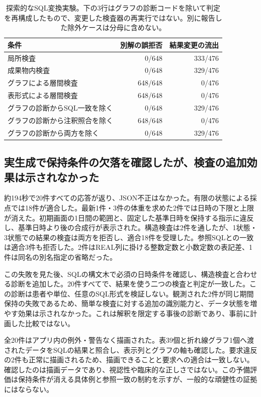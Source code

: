 \documentclass[manuscript,review,anonymous]{acmart}
\begin{document}
\begin{table}[t]
  \caption{探索的なSQL変換実験。下の3行はグラフの診断コードを除いて判定を再構成したもので、変更した検査器の再実行ではない。別に報告した除外ケースは分母に含めない。}
  \label{tab:stress-results}
  \centering
  \small
  \begin{tabular}{lrr}
    \toprule
    条件 & 別解の誤拒否 & 結果変更の流出 \\
    \midrule
    局所検査 & 0/648 & 333/476 \\
    成果物内検査 & 0/648 & 329/476 \\
    グラフによる層間検査 & 648/648 & 0/476 \\
    表形式による層間検査 & 648/648 & 0/476 \\
    グラフの診断からSQL一致を除く & 0/648 & 329/476 \\
    グラフの診断から注釈照合を除く & 648/648 & 0/476 \\
    グラフの診断から両方を除く & 0/648 & 329/476 \\
    \bottomrule
  \end{tabular}
\end{table}

\subsection{実生成で保持条件の欠落を確認したが、検査の追加効果は示されなかった}

約194秒で20件すべての応答が返り、JSON不正はなかった。有限の状態による採点では18件が適合した。最新1件・3件の体重を求めた2件では日時の下限と上限が消えた。初期画面の1日間の範囲と、固定した基準日時を保持する指示に違反し、基準日時より後の合成行が表示された。構造検査は2件を通したが、1状態・3状態での結果の検査は両方を拒否し、適合18件を受理した。参照SQLとの一致は適合3件も拒否した。2件はREAL列に掛ける整数定数と小数定数の表記差、1件は同名の別名指定の省略だった。

この失敗を見た後、SQLの構文木で必須の日時条件を確認し、構造検査と合わせる診断を追加した。20件すべてで、結果を使う二つの検査と判定が一致した。この診断は患者や単位、任意のSQL形式を検証しない。観測された2件が同じ期間保持の失敗であるため、簡単な検査に対する追加の識別能力と、データ状態を増やす効果は示されなかった。これは解釈を限定する事後の診断であり、事前に計画した比較ではない。

全20件はアプリ内の例外・警告なく描画された。表39個と折れ線グラフ1個へ渡されたデータをSQLの結果と照合し、表示列とグラフの軸も確認した。要求違反の2件も正常に描画されるため、描画できることと要求への適合は一致しない。確認したのは描画データであり、視認性や臨床的な正しさではない。この予備評価は保持条件が消える具体例と参照一致の制約を示すが、一般的な頑健性の証拠にはならない。
\end{document}
